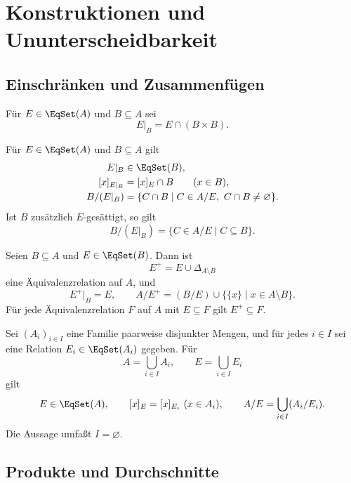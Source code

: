 \chapter{Konstruktionen und Ununterscheidbarkeit}
\label{b11guide:ch:constructions}

\section{Einschränken und Zusammenfügen}

\begin{definition}
Für $E\in\EqSet(A)$ und $B\subseteq A$ sei
\[
 E|_B=E\cap(B\times B).
\]
\end{definition}

\begin{theorem}
\label{b11guide:thm:restriction}
Für $E\in\EqSet(A)$ und $B\subseteq A$ gilt
\[
\begin{aligned}
 E|_B&\in\EqSet(B),\\
 [x]_{E|_B}&=[x]_E\cap B\qquad(x\in B),\\
 B/(E|_B)&=\{C\cap B\mid C\in A/E,\ C\cap B\ne\varnothing\}.
\end{aligned}
\]
Ist $B$ zusätzlich $E$-gesättigt, so gilt
\[
 B/(E|_B)=\{C\in A/E\mid C\subseteq B\}.
\]
\end{theorem}

\begin{theorem}
Seien $B\subseteq A$ und $E\in\EqSet(B)$. Dann ist
\[
 E^+=E\cup\Delta_{A\setminus B}
\]
eine Äquivalenzrelation auf $A$, und
\[
 E^+|_B=E,\qquad
 A/E^+=(B/E)\cup\{\{x\}\mid x\in A\setminus B\}.
\]
Für jede Äquivalenzrelation $F$ auf $A$ mit $E\subseteq F$
gilt $E^+\subseteq F$.
\end{theorem}

\begin{theorem}
Sei $(A_i)_{i\in I}$ eine Familie paarweise disjunkter Mengen,
und für jedes $i\in I$ sei eine Relation $E_i\in\EqSet(A_i)$
gegeben. Für
\[
 A=\bigcup_{i\in I}A_i,\qquad E=\bigcup_{i\in I}E_i
\]
gilt
\[
 E\in\EqSet(A),\qquad
 [x]_E=[x]_{E_i}\ (x\in A_i),\qquad
 A/E=\bigcup_{i\in I}(A_i/E_i).
\]
Die Aussage umfaßt $I=\varnothing$.
\end{theorem}

\section{Produkte und Durchschnitte}

